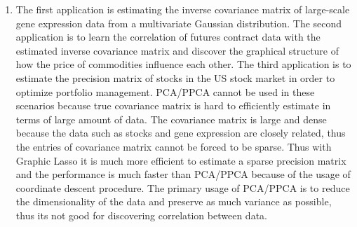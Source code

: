 \documentclass{article}
\begin{document}
\begin{enumerate}
\item
    The first application is estimating the inverse covariance matrix of large-scale gene expression data from a multivariate Gaussian distribution. The second application is to learn the correlation of futures contract data with the estimated inverse covariance matrix and discover the graphical structure of how the price of commodities influence each other. The third application is to estimate the precision matrix of stocks in the US stock market in order to optimize portfolio management. PCA/PPCA cannot be used in these scenarios because true covariance matrix is hard to efficiently estimate in terms of large amount of data. The covariance matrix is large and dense because the data such as stocks and gene expression are closely related, thus the entries of covariance matrix cannot be forced to be sparse. Thus with Graphic Lasso it is much more efficient to estimate a sparse precision matrix and the performance is much faster than PCA/PPCA because of the usage of coordinate descent procedure. The primary usage of PCA/PPCA is to reduce the dimensionality of the data and preserve as much variance as possible, thus its not good for discovering correlation between data.
\end{enumerate}
\end{document}
